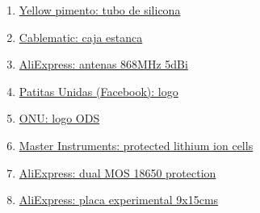 \documentclass[12pt]{article}
\begin{document}
\begin{enumerate}
				\item 
				\label{bib: yellow pimento}
				\href{https://yellowpimento.com/Para-compresores-de-aire/vdvgx-504009/12mm-OD-ft-m-Tubo-flexible-de-caucho-de-silicona-Tubo-de-manguera-de.htm}{Yellow pimento: tubo de silicona}
				
				
				\item 
				\label{bib: cablematic}
				\href{https://cablematic.com/es/productos/caja-estanca-de-superficie-rectangular-ip55-200-x-155-x-80-mm-AE006/}{Cablematic: caja estanca}
				
				\item 
				\label{bib: AliExpress}
				\href{https://es.aliexpress.com/item/32972870968.html?spm=a2g0s.9042311.0.0.274263c0xMPROA}{AliExpress: antenas 868MHz 5dBi}				
				
				
				\item 
				\label{bib: patitas logo}
				\href{https://www.facebook.com/patitasunidaslosalcazares/photos/a.1390104817919443/1979671835629402/?type=1\&theater}{Patitas Unidas (Facebook): logo}		
				
				\item 
				\label{bib: ods logo}
				\href{https://www.un.org/sustainabledevelopment/es/}{ONU: logo ODS}
				
				
				\item 
				\label{bib: protected li-ion cells}
				\href{https://www.master-instruments.com.au/news-article/119/Protected\%20Lithium\%20Ion\%20Cells.html}{Master Instruments: protected lithium ion cells}
				
				
				\item 
				\label{bib: aliexpress dual mos}
				\href{https://es.aliexpress.com/i/32985307442.html}{AliExpress: dual MOS 18650 protection}
				
				
				\item 
				\label{bib: aliexpress placa exp}
				\href{https://es.aliexpress.com/item/32752226972.html}{AliExpress: placa experimental 9x15cms}
				

\end{enumerate}
\end{document}
